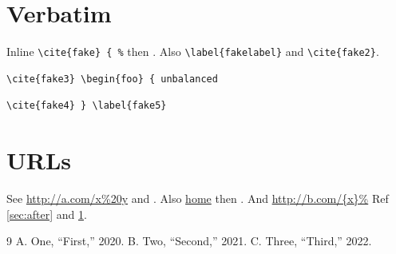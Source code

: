 \documentclass{article}
\begin{document}
\section{Verbatim}\label{sec:verb}
Inline \verb+\cite{fake} { %+ then \cite{k1}.
Also \verb|\label{fakelabel}| and \lstinline|\cite{fake2}|.
\begin{verbatim}
\cite{fake3} \begin{foo} { unbalanced
\end{verbatim}
\begin{lstlisting}
\cite{fake4} } \label{fake5}
\end{lstlisting}

\section{URLs}\label{sec:url}
See \url{http://a.com/x%20y} and \cite{k2}.
Also \href{http://a.com/%7Ex}{home} then \cite{k3}.
And \url{http://b.com/{x}%} \label{sec:after}
Ref \ref{sec:after} and \ref{sec:verb}.
\begin{thebibliography}{9}
 A. One, ``First,'' 2020.
 B. Two, ``Second,'' 2021.
 C. Three, ``Third,'' 2022.
\end{thebibliography}
\end{document}
